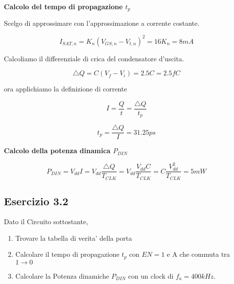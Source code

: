 \documentclass[\main/main.tex]{subfiles}
\begin{document}
\textbf{Calcolo del tempo di propagazione $t_p$}

Scelgo di approssimare con l'approssimazione a corrente costante.

\[I_{SAT,n} = K_n \left( V_{GS,n} - V_{t,n} \right)^2 = 16 K_n = 8mA\]

Calcoliamo il differenziale di crica del condensatore d'uscita.

\[ \triangle Q = C \left( V_f  - V_i\right) = 2.5 C = 2.5 fC\]

ora applichiamo la definizione di corrente

\[ I = \frac{Q}{t} = \frac{\triangle Q}{t_p} \]

\[ t_p = \frac{\triangle Q}{I} = 31.25 ps \]


\textbf{Calcolo della potenza dinamica $P_{DIN}$}

\[ P_{DIN} = V_{dd} I = V_{dd} \frac{\triangle Q}{T_{CLK}} = V_{dd} \frac{V_{dd} C }{T_{CLK}} = C \frac{V_{dd}^2}{T_{CLK}} = 5mW\]



\clearpage
\subsection{Esercizio 3.2}
Dato il Circuito sottostante,
\begin{enumerate}
\item Trovare la tabella di verita' della porta
\item Calcolare il tempo di propagazione  $t_p$  con $EN = 1$ e A che commuta tra $ 1 \rightarrow 0$
\item Calcolare la Potenza dinamiche $P_{DIN}$ con un clock di $f_{a} = 400kHz$.
\end{enumerate}
\end{document}
